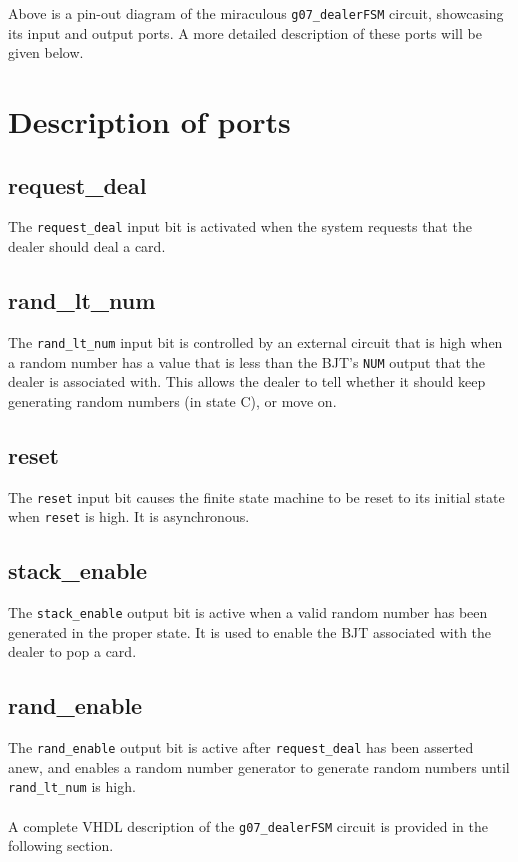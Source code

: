 \documentclass[12pt]{report}
\begin{document}
Above is a pin-out diagram of the miraculous \texttt{g07\_dealerFSM} circuit, showcasing its input
and output ports. A more detailed description of these ports will be given below.

\section*{Description of ports}
\subsection*{request\_deal}
The \texttt{request\_deal} input bit is activated when the system requests that the dealer should
deal a card.
\subsection*{rand\_lt\_num}
The \texttt{rand\_lt\_num} input bit is controlled by an external circuit that is high when a random
number has a value that is less than the BJT's \texttt{NUM} output that the dealer is associated
with. This allows the dealer to tell whether it should keep generating random numbers (in state C),
or move on.
\subsection*{reset}
The \texttt{reset} input bit causes the finite state machine to be reset to its initial state when
\texttt{reset} is high. It is asynchronous.
\subsection*{stack\_enable}
The \texttt{stack\_enable} output bit is active when a valid random number has been generated in the
proper state. It is used to enable the BJT associated with the dealer to pop a card.
\subsection*{rand\_enable}
The \texttt{rand\_enable} output bit is active after \texttt{request\_deal} has been asserted anew,
and enables a random number generator to generate random numbers until \texttt{rand\_lt\_num} is
high.\\\\

A complete VHDL description of the \texttt{g07\_dealerFSM} circuit is provided in the following
section.
\end{document}
